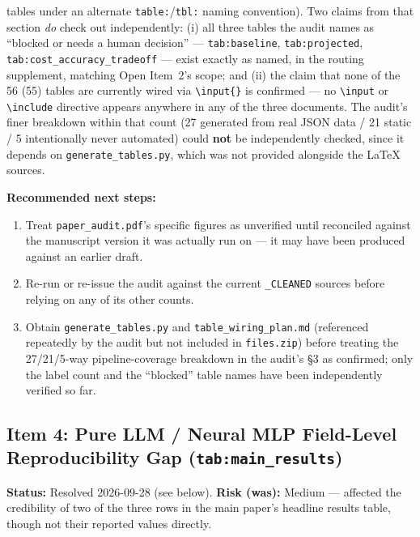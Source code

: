 \documentclass[11pt]{article}
\begin{document}
\begin{itemize}
    tables under an alternate \texttt{table:}/\texttt{tbl:} naming
    convention). Two claims from that section \emph{do} check out
    independently: (i) all three tables the audit names as ``blocked or
    needs a human decision'' — \texttt{tab:baseline},
    \texttt{tab:projected}, \texttt{tab:cost\_accuracy\_tradeoff} — exist
    exactly as named, in the routing supplement, matching Open Item~2's
    scope; and (ii) the claim that none of the 56 (55) tables are
    currently wired via \texttt{\textbackslash input\{\}} is confirmed —
    no \texttt{\textbackslash input} or \texttt{\textbackslash include}
    directive appears anywhere in any of the three documents. The
    audit's finer breakdown within that count (27 generated from real
    JSON data / 21 static / 5 intentionally never automated) could
    \textbf{not} be independently checked, since it depends on
    \texttt{generate\_tables.py}, which was not provided alongside the
    \LaTeX{} sources.
\end{itemize}

\textbf{Recommended next steps:}
\begin{enumerate}
  \item Treat \texttt{paper\_audit.pdf}'s specific figures as unverified
    until reconciled against the manuscript version it was actually run
    on — it may have been produced against an earlier draft.
  \item Re-run or re-issue the audit against the current
    \texttt{\_CLEANED} sources before relying on any of its other counts.
  \item Obtain \texttt{generate\_tables.py} and \texttt{table\_wiring\_plan.md}
    (referenced repeatedly by the audit but not included in
    \texttt{files.zip}) before treating the 27/21/5-way pipeline-coverage
    breakdown in the audit's \S3 as confirmed; only the label count and
    the ``blocked'' table names have been independently verified so far.
\end{enumerate}

\subsection*{Item 4: Pure LLM / Neural MLP Field-Level Reproducibility
Gap (\texttt{tab:main\_results})}
\label{psr:mean-r2}
\textbf{Status:} Resolved 2026-09-28 (see below). \textbf{Risk (was):} Medium — affected the credibility of
two of the three rows in the main paper's headline results table, though
not their reported values directly.
\end{document}
